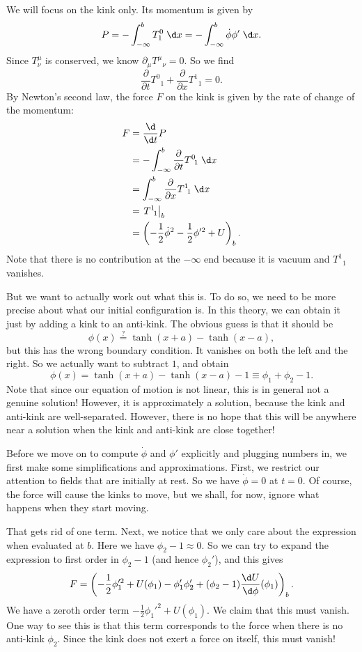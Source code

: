 \documentclass[a4paper]{article}
\begin{document}
We will focus on the kink only. Its momentum is given by
\[
  P = - \int_{-\infty}^b T^0_1 \;\d x = - \int_{-\infty}^b \dot{\phi} \phi' \;\d x.
\]
Since $T^\mu_\nu$ is conserved, we know $\partial_\mu T^\mu\!_\nu = 0$. So we find
\[
  \frac{\partial}{\partial t} T^0\!_1 + \frac{\partial}{\partial x}T^1\!_1 = 0.
\]
By Newton's second law, the force $F$ on the kink is given by the rate of change of the momentum:
\begin{align*}
  F &= \frac{\d}{\d t} P \\
  &= -\int_{-\infty}^b \frac{\partial}{\partial t} T^0\!_1\;\d x \\
  &= \int_{-\infty}^b \frac{\partial}{\partial x} T^1\!_1\;\d x\\
  &= \left.T^1\!_1\right|_b\\
  &= \left(-\frac{1}{2} \dot{\phi}^2 - \frac{1}{2} \phi'^2 + U\right)_b.
\end{align*}
Note that there is no contribution at the $-\infty$ end because it is vacuum and $T^1\!_1$ vanishes.

But we want to actually work out what this is. To do so, we need to be more precise about what our initial configuration is. In this theory, we can obtain it just by adding a kink to an anti-kink. The obvious guess is that it should be
\[
  \phi(x) \overset{?}{=} \tanh(x + a) - \tanh(x - a),
\]
but this has the wrong boundary condition. It vanishes on both the left and the right. So we actually want to subtract $1$, and obtain
\[
  \phi(x) = \tanh(x + a) - \tanh(x - a) - 1 \equiv \phi_1 + \phi_2 - 1.
\]
Note that since our equation of motion is not linear, this is in general not a genuine solution! However, it is approximately a solution, because the kink and anti-kink are well-separated. However, there is no hope that this will be anywhere near a solution when the kink and anti-kink are close together!

Before we move on to compute $\dot{\phi}$ and $\phi'$ explicitly and plugging numbers in, we first make some simplifications and approximations. First, we restrict our attention to fields that are initially at rest. So we have $\dot{\phi} = 0$ at $t = 0$. Of course, the force will cause the kinks to move, but we shall, for now, ignore what happens when they start moving.

That gets rid of one term. Next, we notice that we only care about the expression when evaluated at $b$. Here we have $\phi_2 - 1 \approx 0$. So we can try to expand the expression to first order in $\phi_2 - 1$ (and hence $\phi_2'$), and this gives
\[
  F = \left(-\frac{1}{2}\phi_1'^2 + U(\phi_1) - \phi_1' \phi_2' + (\phi_2 - 1) \frac{\d U}{\d \phi}(\phi_1)\right)_b.
\]
We have a zeroth order term $-\frac{1}{2} \phi_1'^2 + U(\phi_1)$. We claim that this must vanish. One way to see this is that this term corresponds to the force when there is no anti-kink $\phi_2$. Since the kink does not exert a force on itself, this must vanish!
\end{document}

